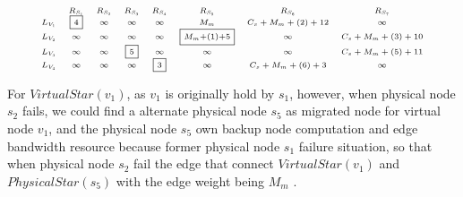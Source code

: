 \begin{equation*}
\tiny{
 {\begin{array}{*{20}{c}}
&R_{S_{1}}&R_{S_{2}}&R_{S_3}&R_{S_4}&R_{S_5}&R_{S_6}&R_{S_{7}}\\
{L_{V_1}}&\fbox{4}&\infty&\infty&\infty&M_{m}&C_{s}+M_{m}+(2)+12&\infty\\
L_{V_2}&\infty&\infty&\infty&\infty&\fbox{$M_{m}$+(1)+5}&\infty&C_{s}+M_{m}+(3)+10\\
L_{V_3}&\infty&\infty&\fbox{5}&\infty&\infty&\infty&C_{s}+M_{m}+(5)+11\\
L_{V_4}&\infty&\infty&\infty&\fbox{3}&\infty&C_{s}+M_{m}+(6)+3&\infty\\
\end{array}}
}
\label{lab:Node2FaliureAlignmentMatrixNew}
\end{equation*}


For $VirtualStar(v_1)$, as $v_1$ is originally hold by $s_1$, however, when physical node $s_2$ fails, we could find a alternate physical node $s_5$ as migrated node for virtual node $v_1$, and the physical node $s_5$ own backup node computation and edge bandwidth resource because former physical node $s_1$ failure situation, so that when physical node $s_2$ fail the edge that connect $VirtualStar(v_1)$ and $PhysicalStar(s_5)$ with the edge weight being $M_m$ .


